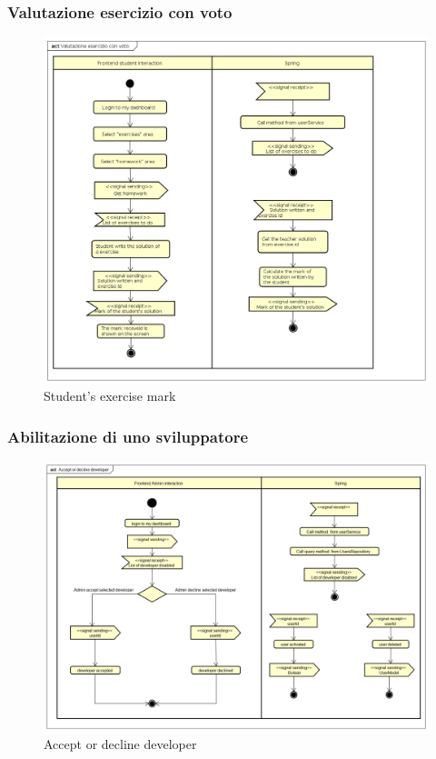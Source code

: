 \subsubsection{Valutazione esercizio con voto}
\begin{figure}[H]
\centering
\includegraphics[width=17cm, keepaspectratio]{img/Student-exercise-mark.png} 
\caption{Student's exercise mark}
\end{figure}

\subsubsection{Abilitazione di uno sviluppatore}
\begin{figure}[H]
\centering
\includegraphics[width=17cm, keepaspectratio]{img/Accept-or-decline-developer.png} 
\caption{Accept or decline developer}
\end{figure}

